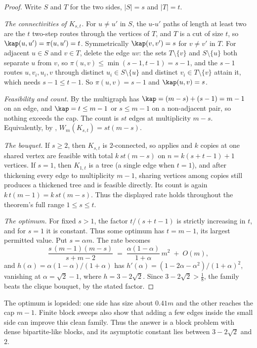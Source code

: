 \begin{proof}
Write $S$ and $T$ for the two sides, $|S| = s$ and $|T| = t$.

\emph{The connectivities of $K_{s,t}$.} For $u \ne u'$ in $S$, the $u$-$u'$ paths of length at least two are the $t$ two-step routes through the vertices of $T$, and $T$ is a cut of size $t$, so $\kap(u,u') = \pi(u,u') = t$. Symmetrically $\kap(v,v') = s$ for $v \ne v'$ in $T$. For adjacent $u \in S$ and $v \in T$, delete the edge $uv$: the sets $T \setminus \{v\}$ and $S \setminus \{u\}$ both separate $u$ from $v$, so $\pi(u,v) \le \min(s-1, t-1) = s-1$, and the $s-1$ routes $u, v_i, u_i, v$ through distinct $u_i \in S \setminus \{u\}$ and distinct $v_i \in T \setminus \{v\}$ attain it, which needs $s-1 \le t-1$. So $\pi(u,v) = s-1$ and $\kap(u,v) = s$.

\emph{Feasibility and count.} By  the multigraph has $\kap = (m-s) + (s-1) = m-1$ on an edge, and $\kap = t \le m-1$ or $s \le m-1$ on a non-adjacent pair, so nothing exceeds the cap. The count is $st$ edges at multiplicity $m-s$. Equivalently, by , $W_m(K_{s,t}) = st(m - s)$.

\emph{The bouquet.} If $s\ge2$, then $K_{s,t}$ is $2$-connected, so  applies and $k$ copies at one shared vertex are feasible with total $k\,st(m-s)$ on $n = k(s+t-1)+1$ vertices. If $s=1$, then $K_{1,t}$ is a tree (a single edge when $t=1$), and after thickening every edge to multiplicity $m-1$, sharing vertices among copies still produces a thickened tree and is feasible directly. Its count is again $k\,t(m-1)=k\,st(m-s)$. Thus the displayed rate holds throughout the theorem's full range $1\le s\le t$.

\emph{The optimum.} For fixed $s>1$, the factor $t/(s+t-1)$ is strictly increasing in $t$, and for $s=1$ it is constant. Thus some optimum has $t=m-1$, its largest permitted value. Put $s = \alpha m$. The rate becomes
\[
    \frac{s\,(m-1)(m-s)}{s+m-2}
    \;=\; \frac{\alpha(1-\alpha)}{1+\alpha}\,m^2 \;+\; O(m) ,
\]
and $h(\alpha) = \alpha(1-\alpha)/(1+\alpha)$ has $h'(\alpha) = (1 - 2\alpha - \alpha^2)/(1+\alpha)^2$, vanishing at $\alpha = \sqrt{2}-1$, where $h = 3 - 2\sqrt{2}$. Since $3 - 2\sqrt{2} > \tfrac18$, the family beats the clique bouquet, by the stated factor.
\end{proof}

The optimum is lopsided: one side has size about $0.41m$ and the other reaches
the cap $m-1$. Finite block sweeps also show that adding a few edges inside
the small side can improve this clean family. Thus the answer is a block
problem with dense bipartite-like blocks, and its asymptotic constant lies
between $3-2\sqrt2$ and $2$.
